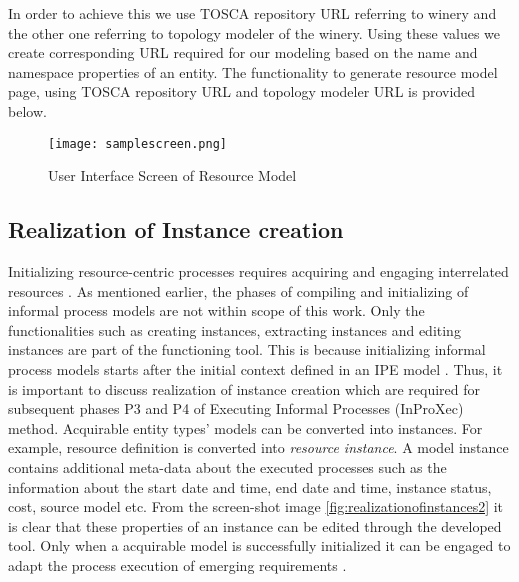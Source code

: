 In order to achieve this we use TOSCA repository URL referring to winery and the other one referring to topology modeler of the winery. Using these values we create corresponding URL required for our modeling based on the name and namespace properties of an entity. The functionality to generate resource model page, using TOSCA repository URL and topology modeler URL is provided below.

			
			
\begin{figure}
	\centering
	\texttt{[image: samplescreen.png]}
	\caption{User Interface Screen of Resource Model}
	\label{fig:realizationofresourcemodel}
\end{figure}



		
\subsection{Realization of Instance creation}
Initializing resource-centric processes requires acquiring and engaging interrelated resources \cite{Sungur2015}. As mentioned earlier, the phases of compiling and initializing of informal process models are not within scope of this work. Only the functionalities such as creating instances, extracting instances and editing instances are part of the functioning tool. This is because initializing informal process models starts after the initial context defined in an IPE model \cite{Sungur2015}. Thus, it is important to discuss realization of instance creation which are required for subsequent phases P3 and P4 of Executing Informal Processes (InProXec) method. Acquirable entity types' models can be converted into instances. For example, resource definition is converted into \textit{resource instance}. A model instance contains additional meta-data about the executed processes such as the information about the start date and time, end date and time, instance status, cost, source model etc. From the screen-shot image \ref{fig:realizationofinstances2} it is clear that these properties of an instance can be edited through the developed tool. Only when a acquirable model is successfully initialized it can be engaged to adapt the process execution of emerging requirements \cite{Sungur2015}. 


